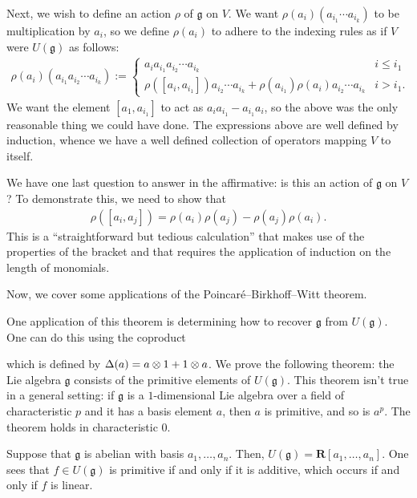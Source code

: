 \documentclass [11 pt, twoside] {article}
\begin{document}
Next, we wish to define an action $\rho$ of $\mathfrak{g}$ on $V$.
We want $\rho(a_{i}) (a_{i_1}\cdots a_{i_{k}})$ to be multiplication by $a_{i}$, so we define $\rho(a_{i})$ to adhere to the indexing rules as if $V$ were $U(\mathfrak{g})$ as follows:
\begin{align*}
	\rho(a_{i}) (a_{i_1}a_{i_2}\cdots a_{i_{k}}) := 
	\begin{cases}
		a_{i}a_{i_1}a_{i_2}\cdots a_{i_{k}}& i\le i_1\\
		\rho([a_{i},a_{i_1}]) a_{i_2}\cdots a_{i_{k}} + \rho(a_{i_1}) \rho(a_{i})a_{i_2} \cdots a_{i_{k}} & i > i_{1}.
	\end{cases}
\end{align*}
We want the element $[a_{1},a_{i_1}]$ to act as $a_{i}a_{i_1}- a_{i_1}a_{i}$, so the above was the only reasonable thing we could have done.
The expressions above are well defined by induction, whence we have a well defined collection of operators mapping $V$ to itself.

We have one last question to answer in the affirmative: is this an action of $\mathfrak{g}$ on $V$?
To demonstrate this, we need to show that
\begin{align*}
	\rho([a_{i},a_{j}]) = \rho(a_{i}) \rho(a_{j})-\rho(a_{j}) \rho(a_{i}).
\end{align*}
This is a ``straightforward but tedious calculation'' that makes use of the properties of the bracket and that requires the application of induction on the length of monomials.

Now, we cover some applications of the Poincar\'e--Birkhoff--Witt theorem.

One application of this theorem is determining how to recover $\mathfrak{g}$ from $U(\mathfrak{g})$.
One can do this using the coproduct 
which is defined by $\Delta(a) = a\otimes 1 + 1\otimes a$. We prove the following theorem: the Lie algebra $\mathfrak{g}$ consists of the primitive elements of $U(\mathfrak{g})$.
This theorem isn't true in a general setting: if $\mathfrak{g}$ is a $1$-dimensional Lie algebra over a field of characteristic $p$ and it has a basis element $a$, then $a$ is primitive, and so is $a^{p}$.
The theorem holds in characteristic $0$.

Suppose that $\mathfrak{g}$ is abelian with basis $a_1,\hdots,a_{n}$. Then, $U(\mathfrak{g}) = \mathbf{R}[a_1,\hdots,a_{n}]$. One sees that $f\in U(\mathfrak{g})$  is primitive if and only if it is additive, which occurs if and only if $f$ is linear.
\end{document}
